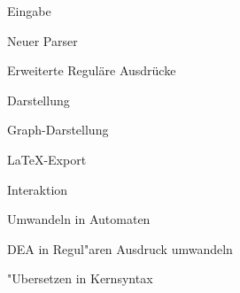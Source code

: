 {
   \begin{itemgroup}{}
      \item Eingabe
      \begin{itemgroup}{}
         \item Neuer Parser
         \item Erweiterte Reguläre Ausdrücke
      \end{itemgroup}
      \item Darstellung
      \begin{itemgroup}{}
         \item Graph-Darstellung
         \item \LaTeX-Export
      \end{itemgroup}
      \item Interaktion
      \begin{itemgroup}{}
         \item Umwandeln in Automaten
         \item DEA in Regul"aren Ausdruck umwandeln
         \item "Ubersetzen in Kernsyntax
      \end{itemgroup}
   \end{itemgroup}
   \vfill{}
}
